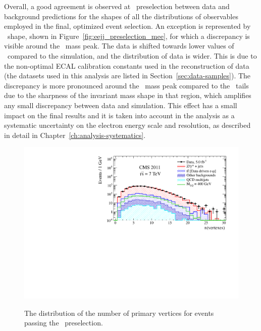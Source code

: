 Overall, a good agreement is observed at \eejj~preselection between data and 
background predictions for the shapes of all the distributions of observables employed in the final, 
optimized event selection. An exception is represented by \mee~shape, shown in Figure~\ref{fig:eejj_preselection_mee}, 
for which a discrepancy is visible around the \PZz~mass peak. The data is shifted towards lower 
values of \mee~compared to the simulation, and the distribution of data is wider. This is due to the 
non-optimal ECAL calibration constants used in the reconstruction of data 
(the datasets used in this analysis are listed in Section~\ref{sec:data-samples}).
The discrepancy is more pronounced around the \PZz~mass peak 
compared to the \mee~tails due to the sharpness of the invariant mass shape in that region, 
which amplifies any small discrepancy between data and simulation. This effect 
has a small impact on the final results and it is taken into account in the analysis as a systematic 
uncertainty on the electron energy scale and resolution, as described in detail 
in Chapter~\ref{ch:analysis-systematics}.

\begin{figure}
  \begin{center}
    {\includegraphics[width=.49\textwidth]{tex/analysis/event_selection/fig/ee/preselection/nVertex_PAS_eejj_WZSherpa_noNSigma.pdf}}\\
    \caption{
      The distribution of the number of primary vertices for events passing the
      \eejj~preselection.
    }
    \label{fig:eejj_preselection_vertices}
  \end{center}
\end{figure}

